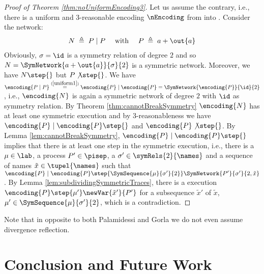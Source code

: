 \documentclass[11pt,techReport]{eptcs}
\begin{document}
\begin{proof}[Proof of Theorem \ref{thm:noUniformEncoding3}]
	Let us assume the contrary, i.e., there is a uniform and 3-reasonable encoding $ \nEncoding $ from \pimix into \pisep. Consider the network:
	\begin{align*}
		N \; \triangleq \; P \mid P \quad \text{ with } \quad P \; \triangleq \; a + \out{a}
	\end{align*}
	Obviously, $ \sigma = \id $ is a symmetry relation of degree $ 2 $ and so $ N = \SymNetwork{a + \out{a}}{\sigma}{2} $ is a symmetric network. Moreover, we have $ N \step{} $ but $ P \not\step{} $. We have $ \encoding{P \mid P} \stackrel{(\ref{uniform1})}= \encoding{P} \mid \encoding{P} = \SymNetwork{\encoding{P}}{\id}{2} $, i.e., $ \encoding{N} $ is again a symmetric network of degree $ 2 $ with $ \id $ as symmetry relation. By Theorem \ref{thm:cannotBreakSymmetry} $ \encoding{N} $ has at least one symmetric execution and by 3-reasonableness we have $ \encoding{P} \mid \encoding{P} \step{} $ and $ \encoding{P} \not\step{} $. By Lemma \ref{lem:cannotBreakSymmetry}, $ \encoding{P} \mid \encoding{P} \step{} $ implies that there is at least one step in the symmetric execution, i.e., there is a $ \mu \in \lab $, a process $ P' \in \pisep $, a $ \sigma' \in \symRels{2}{\names} $ and a sequence of names $ \tilde{x} \in \tupel{\names} $ such that $ \encoding{P} \mid \encoding{P} \step{\SymSequence{\mu}{\sigma'}{2}} \SymNetwork{P'}{\sigma'}{2, \tilde{x}} $. By Lemma \ref{lem:subdividingSymmetricTraces}, there is a execution $ \encoding{P} \step{\mu'} \newVar{\tilde{x}'}{P'} $ for a subsequence $ \tilde{x}' $ of $ \tilde{x} $, $ \mu' \in \SymSequence{\mu}{\sigma'}{2} $, which is a contradiction.
\end{proof}

Note that in opposite to both Palamidessi and Gorla we do not even assume divergence reflection.








\section{Conclusion and Future Work} \label{sec:conclusion}
\end{document}
